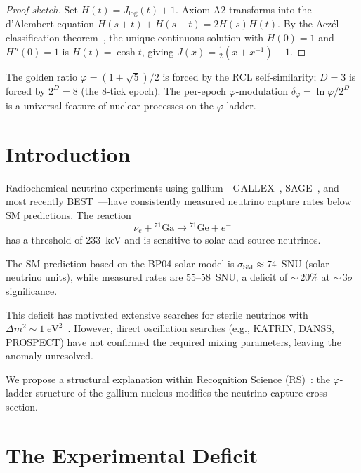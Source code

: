 \documentclass[12pt,a4paper]{article}
\theoremstyle{definition}
\theoremstyle{remark}
\begin{document}
\begin{proof}[Proof sketch]
Set $H(t) = J_{\log}(t)+1$.  Axiom A2 transforms into the d'Alembert
equation $H(s+t)+H(s-t)=2H(s)H(t)$.  By the Acz\'el classification
theorem~\cite{Aczel1966}, the unique continuous solution with $H(0)=1$
and $H''(0)=1$ is $H(t)=\cosh t$, giving
$J(x)=\tfrac{1}{2}(x+x^{-1})-1$.
\end{proof}

\noindent The golden ratio $\varphi=(1+\sqrt{5})/2$ is forced by the RCL
self-similarity; $D=3$ is forced by $2^D=8$ (the 8-tick epoch).
The per-epoch $\varphi$-modulation $\delta_\varphi = \ln\varphi/2^D$
is a universal feature of nuclear processes on the $\varphi$-ladder.

\section{Introduction}
\label{sec:intro}

Radiochemical neutrino experiments using gallium---GALLEX~\cite{GALLEX1999},
SAGE~\cite{SAGE2009}, and most recently BEST~\cite{BEST2022}---have
consistently measured neutrino capture rates below SM predictions.  The
reaction
\begin{equation}
  \nu_e + {}^{71}\mathrm{Ga} \to {}^{71}\mathrm{Ge} + e^-
\end{equation}
has a threshold of 233~keV and is sensitive to solar and source neutrinos.

The SM prediction based on the BP04 solar model is
$\sigma_{\mathrm{SM}} \approx 74$~SNU (solar neutrino units), while
measured rates are $55$--$58$~SNU, a deficit of ${\sim}\,20\%$ at
${\sim}\,3\sigma$ significance.

This deficit has motivated extensive searches for sterile neutrinos
with $\Delta m^2 \sim 1\;\mathrm{eV}^2$~\cite{Giunti2019}.  However,
direct oscillation searches (e.g., KATRIN, DANSS, PROSPECT) have not
confirmed the required mixing parameters, leaving the anomaly unresolved.

We propose a structural explanation within Recognition Science
(RS)~\cite{RS_Axioms}: the $\varphi$-ladder structure of the gallium
nucleus modifies the neutrino capture cross-section.

\section{The Experimental Deficit}
\label{sec:deficit}
\end{document}

